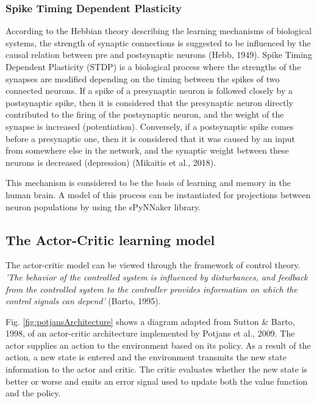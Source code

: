 \documentclass[10pt]{article}
\begin{document}
    \subsubsection{Spike Timing Dependent Plasticity}

    According to the Hebbian theory describing the learning mechanisms of biological systems, the strength of synaptic connections is suggested to be influenced by the causal relation between pre and postsynaptic neurons (Hebb, 1949).
    Spike Timing Dependent Plasticity (STDP) is a biological process where the strengths of the synapses are modified depending on the timing between the spikes of two connected neurons. If a spike of a presynaptic neuron is followed closely by a postsynaptic spike, then it is considered that the presynaptic neuron directly contributed to the firing of the postsynaptic neuron, and the weight of the synapse is increased (potentiation). Conversely, if a postsynaptic spike comes before a presynaptic one, then it is considered that it was caused by an input from somewhere else in the network, and the synaptic weight between these neurons is decreased (depression) (Mikaitis et al., 2018).

    This mechanism is considered to be the basis of learning and memory in the human brain. A model of this process can be instantiated for projections between neuron populations by using the sPyNNaker library.

    \subsection{The Actor-Critic learning model}

    The actor-critic model can be viewed through the framework of control theory. \textit{'The behavior of the controlled system is influenced
    by disturbances, and feedback from the controlled system to the controller provides information on which the control signals can depend'} (Barto, 1995).

    Fig. \ref{fig:potjansArchitecture} shows a diagram adapted from Sutton \& Barto, 1998, of an actor-critic architecture implemented by Potjans et al., 2009. The actor supplies an action to the environment based on its policy. As a result of the action, a new state is entered and the environment transmits the new state information to the actor and critic. The critic evaluates whether the new state is better or worse and emits an error signal used to update both the value function and the policy.
\end{document}

